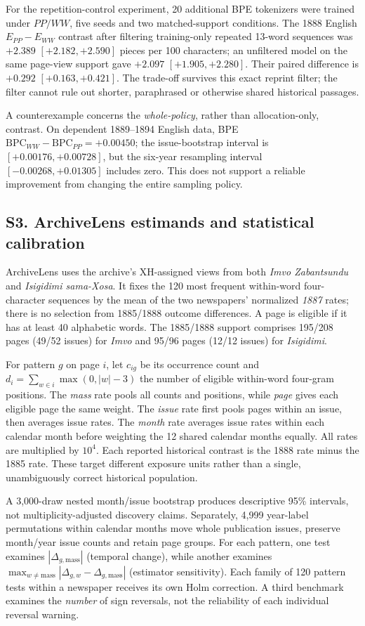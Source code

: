 For the repetition-control experiment, 20 additional BPE tokenizers
were trained under $PP/WW$, five seeds and two matched-support
conditions. The 1888 English $E_{PP}-E_{WW}$ contrast after filtering
training-only repeated 13-word sequences was $+2.389$
$[+2.182,+2.590]$ pieces per 100 characters; an unfiltered model on
the same page-view support gave $+2.097$ $[+1.905,+2.280]$.
Their paired difference is $+0.292$ $[+0.163,+0.421]$.
The trade-off survives this exact reprint filter;
the filter cannot rule out shorter, paraphrased or otherwise shared
historical passages.

A counterexample concerns the \emph{whole-policy}, rather than
allocation-only, contrast. On dependent 1889--1894 English data,
BPE $\mathrm{BPC}_{WW}-\mathrm{BPC}_{PP}=+0.00450$; the issue-bootstrap
interval is $[+0.00176,+0.00728]$, but the six-year resampling
interval $[-0.00268,+0.01305]$ includes zero. This does not support
a reliable improvement from changing the entire sampling policy.

\subsection*{S3. ArchiveLens estimands and statistical calibration}
ArchiveLens uses the archive's XH-assigned views from both
\emph{Imvo Zabantsundu} and \emph{Isigidimi sama-Xosa}.
It fixes the 120 most frequent within-word four-character sequences
by the mean of the two newspapers' normalized \emph{1887} rates;
there is no selection from 1885/1888 outcome differences.
A page is eligible if it has at least 40 alphabetic words.
The 1885/1888 support comprises 195/208 pages (49/52 issues)
for \emph{Imvo} and 95/96 pages (12/12 issues) for \emph{Isigidimi}.

For pattern $g$ on page $i$, let $c_{ig}$ be its occurrence count and
$d_i=\sum_{w\in i}\max(0,|w|-3)$ the number of eligible within-word
four-gram positions. The \emph{mass} rate pools all counts and
positions, while \emph{page} gives each eligible page the same weight.
The \emph{issue} rate first pools pages within an issue, then averages
issue rates. The \emph{month} rate averages issue rates within each
calendar month before weighting the 12 shared calendar months equally.
All rates are multiplied by $10^4$. Each reported historical contrast
is the 1888 rate minus the 1885 rate. These target different exposure units rather than a single,
unambiguously correct historical population.

A 3,000-draw nested month/issue bootstrap produces descriptive
95\% intervals, not multiplicity-adjusted discovery claims.
Separately, 4,999 year-label permutations within calendar months move
whole publication issues, preserve month/year issue counts and retain
page groups. For each pattern, one test examines
$|\Delta_{g,\mathrm{mass}}|$ (temporal change), while another examines
$\max_{w\ne\mathrm{mass}}|\Delta_{g,w}-\Delta_{g,\mathrm{mass}}|$
(estimator sensitivity). Each family of 120 pattern tests within a
newspaper receives its own Holm correction. A third benchmark examines
the \emph{number} of sign reversals, not the reliability of each
individual reversal warning.

